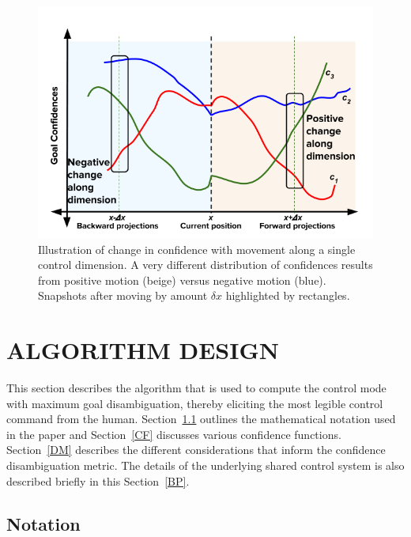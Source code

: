 \documentclass[conference]{IEEEtran}
\begin{document}
\begin{figure}
	\includegraphics[width = 1\hsize, height = 0.26\vsize]{./figures/DisambMetric_New.png}
	\vspace{-0.4cm}
	\caption{Illustration of change in confidence with movement along a single control dimension. A very different distribution of confidences results from positive motion (beige) versus negative motion (blue). Snapshots after moving by amount $\delta x$ highlighted by rectangles.}
	\label{DM_FIG}
\end{figure}
\section{ALGORITHM DESIGN} \label{ALGO}
This section describes the algorithm that is used to compute the control mode with maximum goal disambiguation, thereby eliciting the most legible control command from the human. Section~\ref{NOT} outlines the mathematical notation used in the paper and Section~\ref{CF} discusses various confidence functions. Section~\ref{DM} describes the different considerations that inform the confidence disambiguation metric. The details of the underlying shared control system is also described briefly in this Section~\ref{BP}.

\subsection{Notation}\label{NOT}

\end{document}
